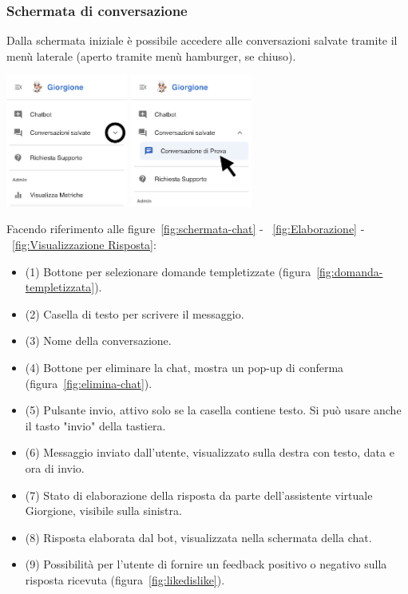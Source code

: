 \subsubsection{Schermata di conversazione}
Dalla schermata iniziale è possibile accedere alle conversazioni salvate tramite il menù laterale (aperto tramite menù hamburger, se chiuso).
\begin{center}
    \includegraphics[width=0.3\textwidth]{./img/laterale1.png}
    \hspace{0.05\textwidth}
    \includegraphics[width=0.3\textwidth]{./img/laterale2.png}
\end{center}

Facendo riferimento alle figure~\ref{fig:schermata-chat} - ~\ref{fig:Elaborazione} - ~\ref{fig:Visualizzazione Risposta}:
\begin{itemize}
    \item (1) Bottone per selezionare domande templetizzate (figura~\ref{fig:domanda-templetizzata}).
    \item (2) Casella di testo per scrivere il messaggio.
    \item (3) Nome della conversazione.
    \item (4) Bottone per eliminare la chat, mostra un pop-up di conferma (figura~\ref{fig:elimina-chat}).
    \item (5) Pulsante invio, attivo solo se la casella contiene testo. Si può usare anche il tasto "invio" della tastiera.
    \item (6) Messaggio inviato dall'utente, visualizzato sulla destra con testo, data e ora di invio. 
    \item (7) Stato di elaborazione della risposta da parte dell’assistente virtuale Giorgione, visibile sulla sinistra.
    \item (8) Risposta elaborata dal bot, visualizzata nella schermata della chat. 
    \item (9) Possibilità per l’utente di fornire un feedback positivo o negativo sulla risposta ricevuta (figura~\ref{fig:likedislike}).
\end{itemize}

